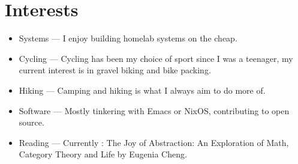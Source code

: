 \documentclass[11pt]{article}
\begin{document}
    \section*{Interests}
    \begin{itemize}
    \item Systems --- I enjoy building homelab systems on the cheap.
    \item Cycling --- Cycling has been my choice of sport since I was a teenager, my current interest is in gravel biking and bike packing.
    \item Hiking --- Camping and hiking is what I always aim to do more of.
    \item Software  --- Mostly tinkering with Emacs or NixOS, contributing to open source.
    \item Reading --- Currently : The Joy of Abstraction: An Exploration of Math, Category Theory and Life by Eugenia Cheng.
    \end{itemize}
\end{document}
